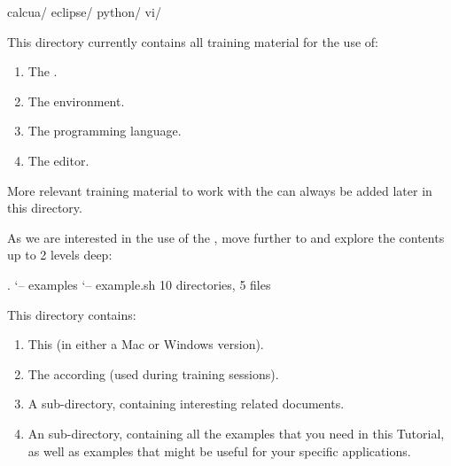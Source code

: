 \begin{prompt}
calcua/
eclipse/
python/
vi/
\end{prompt}

This directory currently contains all training material for the use of:

\begin{enumerate}
\item  The \strong{\emph{\hpc}}.
\item  The  environment.
\item  The  programming language.
\item  The  editor.
\end{enumerate}

More relevant training material to work with the \hpc can always be added
later in this directory.

As we are interested in the use of the , move further to
 and explore the contents up to 2 levels deep:

\begin{prompt}
.
`-- examples
    `-- example.sh
10 directories, 5 files
\end{prompt}

This directory contains:

\begin{enumerate}
  \item This  (in either a Mac or Windows
    version).
  \item The according  (used during training
    sessions).
  \item A  sub-directory, containing interesting \hpc
    related documents.
  \item An  sub-directory, containing all the
    examples that you need in this Tutorial, as well as examples that might be
    useful for your specific applications.
\end{enumerate}

